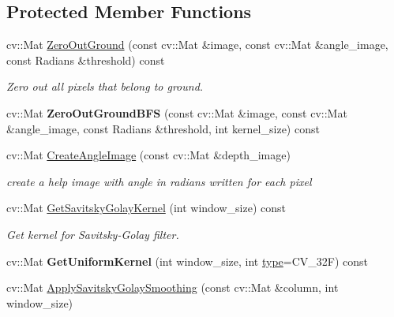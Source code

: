 \subsection*{Protected Member Functions}
\begin{DoxyCompactItemize}
\item 
cv\+::\+Mat \hyperlink{classdepth__clustering_1_1DepthGroundRemover_a81aa3a52c70223555b4f4e1800e05022}{Zero\+Out\+Ground} (const cv\+::\+Mat \&image, const cv\+::\+Mat \&angle\+\_\+image, const Radians \&threshold) const
\begin{DoxyCompactList}\small\item\em Zero out all pixels that belong to ground. \end{DoxyCompactList}\item 
\mbox{\label{classdepth__clustering_1_1DepthGroundRemover_a00ce5997c0dd1692c35ff0a28b94b1b1}} 
cv\+::\+Mat {\bfseries Zero\+Out\+Ground\+B\+FS} (const cv\+::\+Mat \&image, const cv\+::\+Mat \&angle\+\_\+image, const Radians \&threshold, int kernel\+\_\+size) const
\item 
cv\+::\+Mat \hyperlink{classdepth__clustering_1_1DepthGroundRemover_af533c51a44aad9a56c12445b61b801b9}{Create\+Angle\+Image} (const cv\+::\+Mat \&depth\+\_\+image)
\begin{DoxyCompactList}\small\item\em create a help image with angle in radians written for each pixel \end{DoxyCompactList}\item 
cv\+::\+Mat \hyperlink{classdepth__clustering_1_1DepthGroundRemover_a2aeaac524f19861b26c171d845f67e2e}{Get\+Savitsky\+Golay\+Kernel} (int window\+\_\+size) const
\begin{DoxyCompactList}\small\item\em Get kernel for Savitsky-\/\+Golay filter. \end{DoxyCompactList}\item 
\mbox{\label{classdepth__clustering_1_1DepthGroundRemover_a7d67b35fdeaa5fc093cbd857b1405481}} 
cv\+::\+Mat {\bfseries Get\+Uniform\+Kernel} (int window\+\_\+size, int \hyperlink{classdepth__clustering_1_1AbstractSender_a6120bda97c12587db40f34ed73b45475}{type}=C\+V\+\_\+32F) const
\item 
cv\+::\+Mat \hyperlink{classdepth__clustering_1_1DepthGroundRemover_a63b32fa801a13021bf22699525579f8b}{Apply\+Savitsky\+Golay\+Smoothing} (const cv\+::\+Mat \&column, int window\+\_\+size)

\end{DoxyCompactItemize}
